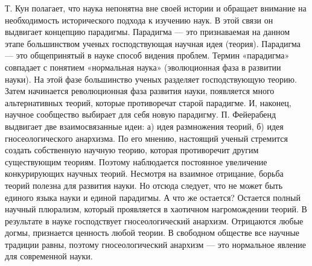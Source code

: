 \documentclass[12pt, specialist, subf, substylefile = spbu.rtx]{disser}
\begin{document}
Т. Кун полагает, что наука непонятна вне своей истории и обращает внимание на необходимость исторического подхода к изучению наук. В этой связи он выдвигает концепцию парадигмы. Парадигма — это признаваемая на данном этапе большинством ученых господствующая научная идея (теория). Парадигма — это общепринятый в науке способ видения проблем. Термин «парадигма» совпадает с понятием «нормальная наука» (эволюционная фаза в развитии науки). На этой фазе большинство ученых разделяет господствующую теорию. Затем начинается революционная фаза развития науки, появляется много альтернативных теорий, которые противоречат старой парадигме. И, наконец, научное сообщество выбирает для себя новую парадигму. 
П. Фейерабенд выдвигает две взаимосвязанные идеи: а) идея размножения теорий, б) идея гносеологического анархизма. 
По его мнению, настоящий ученый стремится создать собственную научную теорию, которая противоречит другим существующим теориям. Поэтому наблюдается постоянное увеличение конкурирующих научных теорий. Несмотря на взаимное отрицание, борьба теорий полезна для развития науки. Но отсюда следует, что не может быть единого языка науки и единой парадигмы. А что же остается? Остается полный научный плюрализм, который проявляется в хаотичном нагромождении теорий. 
В результате в науке господствует гносеологический анархизм. Отрицаются любые догмы, признается ценность любой теории. В свободном обществе все научные традиции равны, поэтому гносеологический анархизм — это нормальное явление для современной науки.
\end{document}
